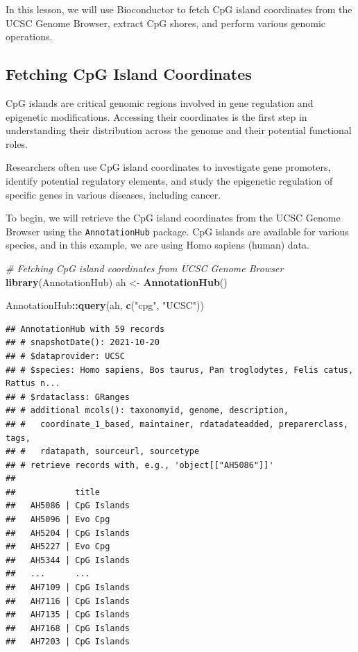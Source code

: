 \documentclass[
]{book}
\newenvironment{Shaded}{\begin{snugshade}}{\end{snugshade}}
\newcommand{\CommentTok}[1]{\textcolor[rgb]{0.56,0.35,0.01}{\textit{#1}}}
\newcommand{\FunctionTok}[1]{\textcolor[rgb]{0.13,0.29,0.53}{\textbf{#1}}}
\newcommand{\NormalTok}[1]{#1}
\newcommand{\OtherTok}[1]{\textcolor[rgb]{0.56,0.35,0.01}{#1}}
\newcommand{\SpecialCharTok}[1]{\textcolor[rgb]{0.81,0.36,0.00}{\textbf{#1}}}
\newcommand{\StringTok}[1]{\textcolor[rgb]{0.31,0.60,0.02}{#1}}
\begin{document}
In this lesson, we will use Bioconductor to fetch CpG island coordinates from the UCSC Genome Browser, extract CpG shores, and perform various genomic operations.

\hypertarget{fetching-cpg-island-coordinates}{%
\subsection{Fetching CpG Island Coordinates}\label{fetching-cpg-island-coordinates}}

CpG islands are critical genomic regions involved in gene regulation and epigenetic modifications. Accessing their coordinates is the first step in understanding their distribution across the genome and their potential functional roles.

Researchers often use CpG island coordinates to investigate gene promoters, identify potential regulatory elements, and study the epigenetic regulation of specific genes in various diseases, including cancer.

To begin, we will retrieve the CpG island coordinates from the UCSC Genome Browser using the \texttt{AnnotationHub} package. CpG islands are available for various species, and in this example, we are using Homo sapiens (human) data.

\begin{Shaded}
\begin{Highlighting}[]
\CommentTok{\# Fetching CpG island coordinates from UCSC Genome Browser}
\FunctionTok{library}\NormalTok{(AnnotationHub)}
\NormalTok{ah }\OtherTok{\textless{}{-}} \FunctionTok{AnnotationHub}\NormalTok{()}

\NormalTok{AnnotationHub}\SpecialCharTok{::}\FunctionTok{query}\NormalTok{(ah, }\FunctionTok{c}\NormalTok{(}\StringTok{"cpg"}\NormalTok{, }\StringTok{"UCSC"}\NormalTok{))}
\end{Highlighting}
\end{Shaded}

\begin{verbatim}
## AnnotationHub with 59 records
## # snapshotDate(): 2021-10-20
## # $dataprovider: UCSC
## # $species: Homo sapiens, Bos taurus, Pan troglodytes, Felis catus, Rattus n...
## # $rdataclass: GRanges
## # additional mcols(): taxonomyid, genome, description,
## #   coordinate_1_based, maintainer, rdatadateadded, preparerclass, tags,
## #   rdatapath, sourceurl, sourcetype 
## # retrieve records with, e.g., 'object[["AH5086"]]' 
## 
##            title      
##   AH5086 | CpG Islands
##   AH5096 | Evo Cpg    
##   AH5204 | CpG Islands
##   AH5227 | Evo Cpg    
##   AH5344 | CpG Islands
##   ...      ...        
##   AH7109 | CpG Islands
##   AH7116 | CpG Islands
##   AH7135 | CpG Islands
##   AH7168 | CpG Islands
##   AH7203 | CpG Islands
\end{verbatim}
\end{document}

